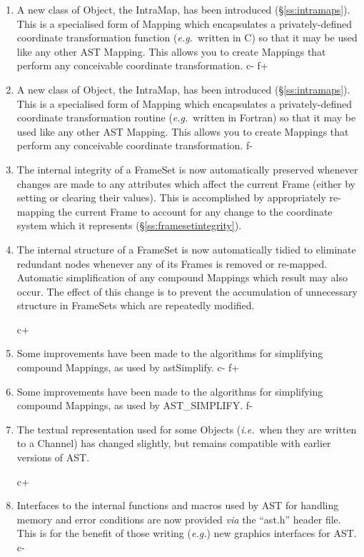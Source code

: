 \documentclass[twoside,11pt]{starlink}
\providecommand{\secref}[1]{\S\ref{#1}}
\begin{document}
\begin{enumerate}
c+
\item A new class of Object, the IntraMap, has been introduced
(\secref{ss:intramaps}). This is a specialised form of Mapping which
encapsulates a privately-defined coordinate transformation function
(\emph{e.g.}\ written in C) so that it may be used like any other AST
Mapping. This allows you to create Mappings that perform any
conceivable coordinate transformation.
c-
f+
\item A new class of Object, the IntraMap, has been introduced
(\secref{ss:intramaps}). This is a specialised form of Mapping which
encapsulates a privately-defined coordinate transformation routine
(\emph{e.g.}\ written in Fortran) so that it may be used like any
other AST Mapping. This allows you to create Mappings that perform any
conceivable coordinate transformation.
f-

\item The internal integrity of a FrameSet is now automatically
preserved whenever changes are made to any attributes which affect the
current Frame (either by setting or clearing their values). This is
accomplished by appropriately re-mapping the current Frame to account
for any change to the coordinate system which it represents
(\secref{ss:framesetintegrity}).

\item The internal structure of a FrameSet is now automatically tidied
to eliminate redundant nodes whenever any of its Frames is removed or
re-mapped. Automatic simplification of any compound Mappings which
result may also occur. The effect of this change is to prevent the
accumulation of unnecessary structure in FrameSets which are
repeatedly modified.

c+
\item Some improvements have been made to the algorithms for
simplifying compound Mappings, as used by astSimplify.
c-
f+
\item Some improvements have been made to the algorithms for
simplifying compound Mappings, as used by AST\_SIMPLIFY.
f-

\item The textual representation used for some Objects
(\emph{i.e.}\ when they are written to a Channel) has changed
slightly, but remains compatible with earlier versions of AST.

c+
\item Interfaces to the internal functions and macros used by AST for
handling memory and error conditions are now provided \emph{via} the
``ast.h'' header file. This is for the benefit of those writing
(\emph{e.g.}) new graphics interfaces for AST.
c-


\end{enumerate}
\end{document}
